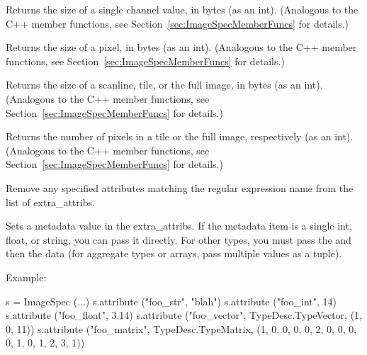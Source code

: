 Returns the size of a single channel value, in bytes (as an
{\cf int}).
(Analogous to the C++ member functions, see 
Section~\ref{sec:ImageSpecMemberFuncs} for details.)
\apiend

Returns the size of a pixel, in bytes (as an {\cf int}).
(Analogous to the C++ member functions, see 
Section~\ref{sec:ImageSpecMemberFuncs} for details.)
\apiend

Returns the size of a scanline, tile, or the full image, in bytes (as an
{\cf int}). (Analogous to the C++ member functions, see 
Section~\ref{sec:ImageSpecMemberFuncs} for details.)
\apiend

Returns the number of pixels in a tile or the full image, respectively
(as an {\cf int}). (Analogous to the C++ member functions, see 
Section~\ref{sec:ImageSpecMemberFuncs} for details.)
\apiend

Remove any specified attributes matching the regular expression {\cf name}
from the list of extra_attribs.
\apiend

Sets a metadata value in the {\cf extra_attribs}.  If the metadata item
is a single {\cf int}, {\cf float}, or {\cf string}, you can pass it
directly. For other types, you must pass the \TypeDesc and then the
data (for aggregate types or arrays, pass multiple values as a tuple).

\noindent Example:
\begin{code}
    s = ImageSpec (...)
    s.attribute ("foo_str", "blah")
    s.attribute ("foo_int", 14)
    s.attribute ("foo_float", 3.14)
    s.attribute ("foo_vector", TypeDesc.TypeVector, (1, 0, 11))
    s.attribute ("foo_matrix", TypeDesc.TypeMatrix,
                 (1, 0, 0, 0, 0, 2, 0, 0, 0, 0, 1, 0, 1, 2, 3, 1))
\end{code}
\apiend

